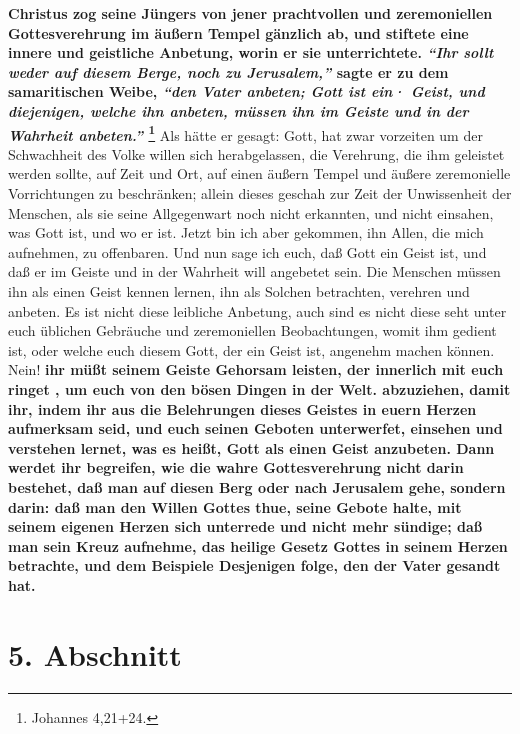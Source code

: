   
\textbf{Christus zog seine Jüngers von jener prachtvollen und zeremoniellen
Gottesverehrung im äußern Tempel gänzlich ab, und stiftete eine innere und
geistliche Anbetung, worin er sie unterrichtete.
\textit{"`Ihr sollt weder auf diesem Berge, noch zu Jerusalem,"'}
sagte er zu dem samaritischen Weibe,
\textit{"`den Vater anbeten; Gott ist ein· Geist, und diejenigen, welche ihn
anbeten, müssen ihn im Geiste und in der Wahrheit anbeten."'}
\footnote{Johannes 4,21+24.}
}
Als hätte er
gesagt: Gott, hat zwar vorzeiten um der Schwachheit des Volke willen sich
herabgelassen, die Verehrung, die ihm geleistet werden sollte, auf Zeit und Ort,
auf einen äußern Tempel und äußere zeremonielle Vorrichtungen zu beschränken;
allein dieses geschah zur Zeit der Unwissenheit der Menschen, als sie seine
Allgegenwart noch nicht erkannten, und nicht einsahen, was Gott ist, und wo er
ist. Jetzt bin ich aber gekommen, ihn Allen, die mich aufnehmen, zu offenbaren.
Und nun sage ich euch, daß Gott ein Geist ist, und daß er im Geiste und in der
Wahrheit will angebetet sein. Die Menschen müssen ihn als einen Geist kennen
lernen, ihn als Solchen betrachten, verehren und anbeten. Es ist nicht diese
leibliche Anbetung, auch sind es nicht diese seht unter euch üblichen Gebräuche
und zeremoniellen Beobachtungen, womit ihm gedient ist, oder welche euch diesem
Gott, der ein Geist ist, angenehm machen können. Nein! \textbf{ihr müßt seinem
Geiste
Gehorsam leisten, der innerlich mit euch ringet , um euch
von den bösen Dingen in
der Welt. abzuziehen, damit ihr, indem ihr aus die Belehrungen dieses Geistes in
euern Herzen aufmerksam seid, und euch seinen Geboten unterwerfet, einsehen und
verstehen lernet, was es heißt, Gott als einen Geist anzubeten. Dann werdet ihr
begreifen, wie die wahre Gottesverehrung nicht darin bestehet, daß man auf
diesen Berg oder nach Jerusalem gehe, sondern darin: daß man den Willen Gottes
thue, seine Gebote halte, mit seinem eigenen Herzen sich unterrede und nicht
mehr sündige; daß man sein Kreuz aufnehme, das heilige Gesetz Gottes in seinem
Herzen betrachte, und dem Beispiele Desjenigen folge, den der Vater gesandt
hat.}

\section{5. Abschnitt} \label{kap5_ab5}

